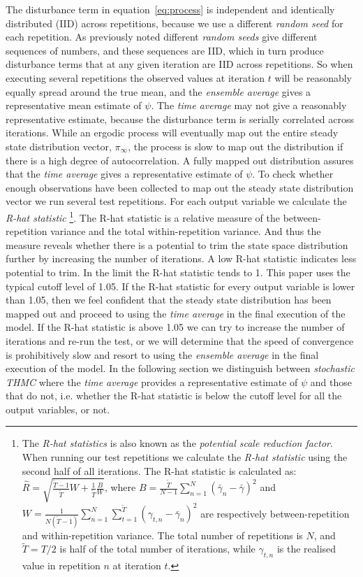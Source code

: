 \documentclass[preprint, 12pt]{elsarticle}
\begin{document}
The disturbance term in equation~\ref{eq:process} is independent and identically distributed (IID) across repetitions, because we use a different \emph{random seed} for each repetition. As previously noted different \emph{random seeds} give different sequences of numbers, and these sequences are IID, which in turn produce disturbance terms that at any given iteration are IID across repetitions. So when executing several repetitions the observed values at iteration $t$ will be reasonably equally spread around the true mean, and the \emph{ensemble average} gives a representative mean estimate of $\psi$. The \emph{time average} may not give a reasonably representative estimate, because the disturbance term is serially correlated across iterations. While an ergodic process will eventually map out the entire steady state distribution vector, $\pi_\infty$, the process is slow to map out the distribution if there is a high degree of autocorrelation. A fully mapped out distribution assures that the \emph{time average} gives a representative estimate of $\psi$. To check whether enough observations have been collected to map out the steady state distribution vector we run several test repetitions. For each output variable we calculate the \emph{R-hat statistic} \citep{Laver_Sergenti_2011, Brooks_Gelman_1998}\footnote{The \emph{R-hat statistics} is also known as the \emph{potential scale reduction factor}. When running our test repetitions we calculate the \emph{R-hat statistic} using the second half of all iterations. The R-hat statistic is calculated as: $\hat R = \sqrt {{\frac{{\tilde T - 1}}{{\tilde T}}W+ \frac{1}{{\tilde T}}\frac{B}{W}}}$, where $B = \frac{{\tilde T}}{{N - 1}}\sum\limits_{n = 1}^N {{{({{\bar \gamma }_n} - \bar \gamma )}^2}}$ and $W = \frac{1}{{N(\tilde T - 1)}}\sum\limits_{n = 1}^N {\sum\limits_{t = 1}^{\tilde T} {{{({\gamma _{t,n}} - {{\bar \gamma }_n})}^2}} }$ are respectively between-repetition and within-repetition variance. The total number of repetitions is $N$, and ${\tilde T}=T/2$ is half of the total number of iterations, while $\gamma _{t,n}$ is the realised value in repetition $n$ at iteration $t$.}. The R-hat statistic is a relative measure of the between-repetition variance and the total within-repetition variance. And thus the measure reveals whether there is a potential to trim the state space distribution further by increasing the number of iterations. A low R-hat statistic indicates less potential to trim. In the limit the R-hat statistic tends to 1. This paper uses the typical cutoff level of 1.05. If the R-hat statistic for every output variable is lower than 1.05, then we feel confident that the steady state distribution has been mapped out and proceed to using the \emph{time average} in the final execution of the model. If the R-hat statistic is above 1.05 we can try to increase the number of iterations and re-run the test, or we will determine that the speed of convergence is prohibitively slow and resort to using the \emph{ensemble average} in the final execution of the model. In the following section we distinguish between \emph{stochastic THMC} where the \emph{time average} provides a representative estimate of $\psi$ and those that do not, i.e. whether the R-hat statistic is below the cutoff level for all the output variables, or not. 
\end{document}
